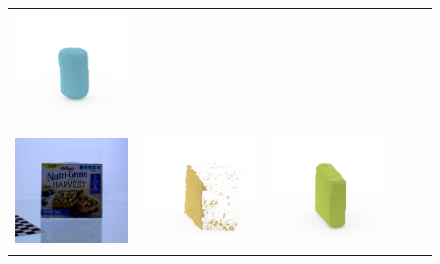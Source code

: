 \documentclass[10pt,twocolumn,letterpaper]{article}
\begin{document}
\begin{figure}
\begin{tabular}{cccccc}
\includegraphics[height=\turnheight, clip=true, trim=60 30 30 60]{data/renders_turn_table/zilla_night_black_heat_NP2_312.mat_oma_view_180} \\
\includegraphics[height=\turnheight, clip=true, trim=30 30 30 30]{data/rgb_ims/nutrigrain_harvest_blueberry_bliss} &
\includegraphics[height=\turnheight, clip=true, trim=60 30 30 60]{data/renders_turn_table/nutrigrain_harvest_blueberry_bliss_NP1_0.mat_visible_pixels_view_0} &
\includegraphics[height=\turnheight, clip=true, trim=60 30 30 60]{data/renders_turn_table/nutrigrain_harvest_blueberry_bliss_NP1_0.mat_gt_view_0} &

\end{tabular}
\end{figure}
\end{document}
